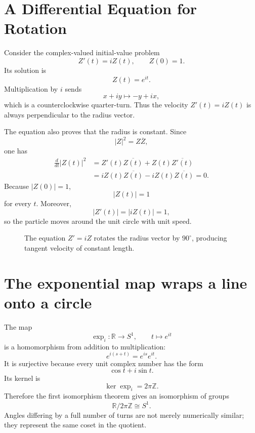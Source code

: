 
\section{A Differential Equation for Rotation}

Consider the complex-valued initial-value problem
\[
  Z'(t)=iZ(t),
  \qquad
  Z(0)=1.
\]
Its solution is
\[
  Z(t)=e^{it}.
\]
Multiplication by \(i\) sends
\[
  x+iy\longmapsto-y+ix,
\]
which is a counterclockwise quarter-turn.  Thus the velocity \(Z'(t)=iZ(t)\) is always perpendicular to the radius vector.

The equation also proves that the radius is constant.  Since
\[
  |Z|^2=Z\overline Z,
\]
one has
\[
\begin{aligned}
  \frac d{dt}|Z(t)|^2
  &=Z'(t)\overline{Z(t)}
    +Z(t)\overline{Z'(t)}\\
  &=iZ(t)\overline{Z(t)}
    -iZ(t)\overline{Z(t)}=0.
\end{aligned}
\]
Because \(|Z(0)|=1\),
\[
  |Z(t)|=1
\]
for every \(t\).  Moreover,
\[
  |Z'(t)|=|iZ(t)|=1,
\]
so the particle moves around the unit circle with unit speed.

\begin{figure}[H]
\centering
{}
\caption{The equation \(Z'=iZ\) rotates the radius vector by \(90^\circ\), producing tangent velocity of constant length.}
\end{figure}

\section{The exponential map wraps a line onto a circle}

The map
\[
  \exp_i:\mathbb R\longrightarrow S^1,
  \qquad
  t\longmapsto e^{it}
\]
is a homomorphism from addition to multiplication:
\[
  e^{i(s+t)}=e^{is}e^{it}.
\]
It is surjective because every unit complex number has the form
\[
  \cos t+i\sin t.
\]
Its kernel is
\[
  \ker\exp_i=2\pi\mathbb Z.
\]
Therefore the first isomorphism theorem gives an isomorphism of groups
\[
  \boxed{
  \mathbb R/2\pi\mathbb Z\cong S^1.}
\]
Angles differing by a full number of turns are not merely numerically similar; they represent the same coset in the quotient.

